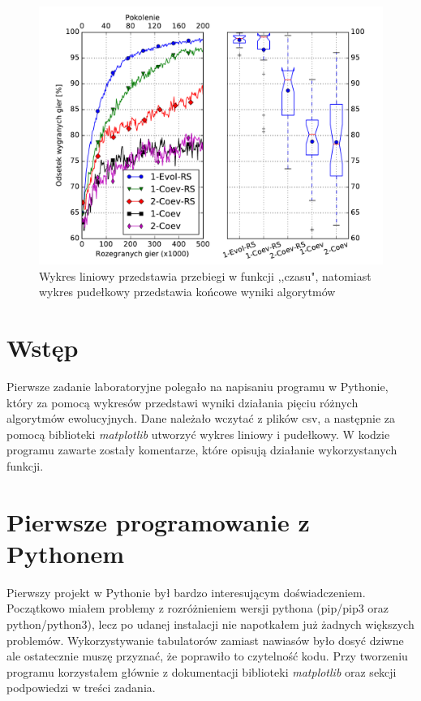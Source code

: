 \documentclass{article}
\begin{document}


\begin{figure}
\begin{center}
\includegraphics[width=1.0\textwidth]{wykresy.pdf}
\end{center}
\caption{Wykres liniowy przedstawia przebiegi w funkcji ,,czasu", natomiast wykres pudełkowy przedstawia końcowe wyniki algorytmów}
\label{fig:schemat}
\end{figure}


\section{Wstęp}

Pierwsze zadanie laboratoryjne polegało na napisaniu programu w Pythonie, który za pomocą wykresów przedstawi wyniki działania pięciu różnych algorytmów ewolucyjnych. Dane należało wczytać z plików csv, a następnie za pomocą biblioteki \textit{matplotlib} utworzyć wykres liniowy i pudełkowy. W kodzie programu zawarte zostały komentarze, które opisują działanie wykorzystanych funkcji.

\section{Pierwsze programowanie z Pythonem}

Pierwszy projekt w Pythonie był bardzo interesującym doświadczeniem. Początkowo miałem problemy z rozróżnieniem wersji pythona (pip/pip3 oraz python/python3), lecz po udanej instalacji nie napotkałem już żadnych większych problemów. Wykorzystywanie tabulatorów zamiast nawiasów było dosyć dziwne ale ostatecznie muszę przyznać, że poprawiło to czytelność kodu. Przy tworzeniu programu korzystałem głównie z dokumentacji biblioteki \textit{matplotlib} oraz sekcji podpowiedzi w treści zadania. 
\end{document}
